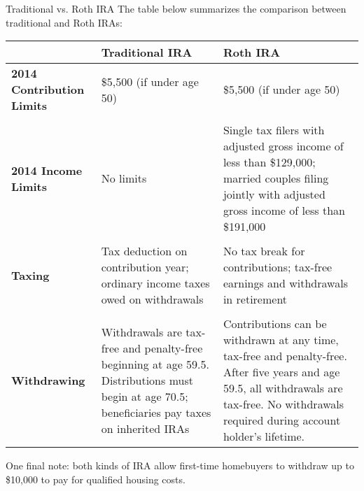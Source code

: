 {\begin{adjustwidth}{-1.75in}{-0.25in}
\begin{proc}{Traditional vs. Roth IRA}
The table below summarizes the comparison between traditional and Roth IRAs:
\begin{center}
\begin{tabular}{p{} | p{} p{}}
& \textbf{Traditional IRA} & \textbf{Roth IRA}\\
\hline
\textbf{2014 Contribution Limits} & \$5,500 (if under age 50) & \$5,500 (if under age 50)\\
& & \\
\textbf{2014 Income Limits} & No limits & Single tax filers with adjusted gross income of less than \$129,000; married couples filing jointly with adjusted gross income of less than \$191,000\\
& & \\
\textbf{Taxing} & Tax deduction on contribution year; ordinary income taxes owed on withdrawals & No tax break for contributions; tax-free earnings and withdrawals in retirement\\
& & \\
\textbf{Withdrawing} & Withdrawals are tax-free and penalty-free beginning at age 59.5.  Distributions must begin at age 70.5; beneficiaries pay taxes on inherited IRAs & Contributions can be withdrawn at any time, tax-free and penalty-free.  After five years and age 59.5, all withdrawals are tax-free.  No withdrawals required during account holder's lifetime.\\
\end{tabular}
\end{center}

One final note: both kinds of IRA allow first-time homebuyers to withdraw up to \$10,000 to pay for qualified housing costs.
\end{proc}
\end{adjustwidth}
} \fi

